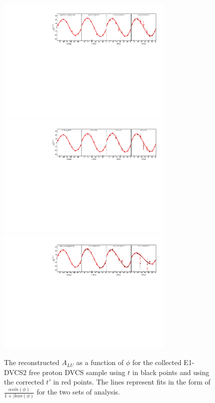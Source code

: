 \documentclass[a4paper,11pt,twoside]{article}
\begin{document}
\begin{figure}[h!]
\centering
\includegraphics[height=6.0cm]{fig/E1DVCS2-ALU_phi_p_Q2.pdf}
\includegraphics[height=6.0cm]{fig/E1DVCS2-ALU_phi_p_x.pdf}
\includegraphics[height=6.0cm]{fig/E1DVCS2-ALU_phi_p_t.pdf}
\caption{The reconstructed $A_{LU}$ as a function of $\phi$ for the collected 
E1-DVCS2 free proton DVCS sample using $t$ in black points and using the 
corrected $t'$ in red points. The lines represent fits in the form of 
$\frac{\alpha sin(\phi)}{1+\beta cos(\phi)}$ for the two sets of analysis.}
\label{fig:t_tprime_ALU_phi}
\end{figure}
\end{document}
